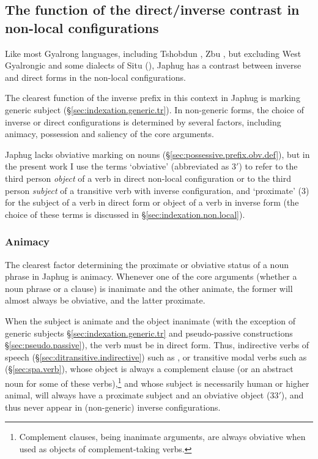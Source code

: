 \subsection{The function of the direct/inverse contrast in non-local configurations} \label{sec:inverse.3.3.saliency}
 
Like most Gyalrong languages, including Tshobdun \citep{jackson02rentongdengdi}, Zbu \citep{gongxun14agreement}, but excluding West Gyalrongic \citep{lai15person} and some dialects of Situ (\citealt{jackson15sastod, zhangsy19obviative}), Japhug has a contrast between inverse and direct forms in the non-local configurations.

The clearest function of the inverse prefix in this context in Japhug is marking generic subject (§\ref{sec:indexation.generic.tr}).  In non-generic forms, the choice of inverse or direct configurations is determined by several factors, including animacy, possession and saliency of the core arguments.

Japhug lacks obviative marking on nouns (§\ref{sec:possessive.prefix.obv.def}), but in the present work I use the terms `obviative' (abbreviated as 3$'$) to refer to the third person \textit{object} of a verb in direct non-local configuration or to the third person \textit{subject} of a transitive verb with inverse configuration, and `proximate' (3) for the subject of a verb in direct form or object of a verb in inverse form (the choice of these terms is discussed in §\ref{sec:indexation.non.local}).
   
\subsubsection{Animacy}  \label{sec:obviation.animacy}
The clearest factor determining the proximate or obviative status of a noun phrase in Japhug is animacy. Whenever one of the core arguments (whether a noun phrase or a clause) is inanimate and the other animate, the former will almost always be obviative, and the latter proximate. 

When the subject is animate and the object inanimate (with the exception of generic subjects §\ref{sec:indexation.generic.tr} and pseudo-passive constructions §\ref{sec:pseudo.passive}), the verb must be in direct form. Thus, indirective verbs of speech (§\ref{sec:ditransitive.indirective}) such as , or transitive modal verbs such as  (§\ref{sec:spa.verb}), whose object is always a complement clause (or an abstract noun for some of these verbs),\footnote{Complement clauses, being inanimate arguments, are always obviative when used as objects of com\-ple\-ment-taking verbs. } and whose subject is necessarily human or higher animal, will always have a proximate subject and an obviative object (3\fl{}3$'$), and thus never appear in (non-generic) inverse configurations. 

